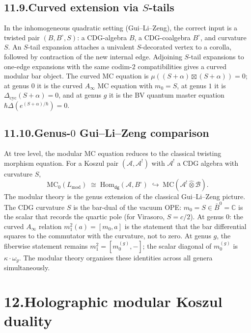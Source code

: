 \documentclass[11pt,reqno]{amsart}
\theoremstyle{definition}
\theoremstyle{remark}
\providecommand{\cA}{\mathcal{A}}
\providecommand{\cB}{\mathcal{B}}
\providecommand{\barB}{\bar{B}}
\providecommand{\MC}{\mathrm{MC}}
\providecommand{\Hom}{\mathrm{Hom}}
\providecommand{\bC}{\mathbb{C}}
\renewcommand{\mod}{\mathrm{mod}}
\numberwithin{equation}{section}
\begin{document}
\subsection*{11.9.\enspace Curved extension via $S$-tails}

In the inhomogeneous quadratic setting (Gui--Li--Zeng), the
correct input is a twisted pair $(B, B^\circ, S)$: a
CDG-algebra $B$, a CDG-coalgebra $B^\circ$, and curvature $S$.
An $S$-tail expansion attaches a univalent $S$-decorated vertex
to a corolla, followed by contraction of the new internal edge.
Adjoining $S$-tail expansions to one-edge expansions with the
same codim-$2$ compatibilities gives a curved modular bar
object. The curved MC equation is
$\mu((S + \alpha) \boxtimes (S + \alpha)) = 0$; at genus $0$
it is the curved $A_\infty$ MC equation with $m_0 = S$, at
genus $1$ it is $\Delta_{\mathrm{cyc}}(S + \alpha) = 0$, and
at genus $g$ it is the BV quantum master equation
$\hbar\Delta(e^{(S+\alpha)/\hbar}) = 0$.

\subsection*{11.10.\enspace Genus-$0$ Gui--Li--Zeng comparison}

At tree level, the modular MC equation reduces to the
classical twisting morphism equation. For a Koszul pair
$(\cA, \cA^!)$ with $\cA^!$ a CDG algebra with curvature $S$,
\[
\MC_0(L_{\mod})
\;\cong\;
\Hom_{\mathsf{dg}}(\cA, B^\circ)
\;\hookrightarrow\;
\MC(\cA^! \widehat\otimes \cB).
\]
The modular theory is the genus extension of the classical
Gui--Li--Zeng picture. The CDG curvature $S$ is the bar-dual of
the vacuum OPE: $m_0 = S \in \barB^0 = \bC$ is the scalar
that records the quartic pole (for Virasoro, $S = c/2$). At
genus $0$: the curved $A_\infty$ relation $m_1^2(a) = [m_0, a]$
is the statement that the bar differential squares to the
commutator with the curvature, not to zero. At genus $g$, the
fiberwise statement remains $m_1^2=[m_0^{(g)},-]$; the scalar diagonal
of $m_0^{(g)}$ is $\kappa \cdot \omega_g$. The
modular theory organises these identities across all genera
simultaneously.


\section*{12.\quad Holographic modular Koszul duality}
\end{document}
